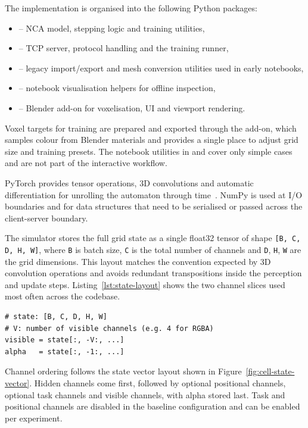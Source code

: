 The implementation is organised into the following Python packages:

\begin{itemize}
        \item {} -- NCA model, stepping logic and training
          utilities,
        \item {} -- TCP server, protocol handling and the
          training runner,
    \item {} -- legacy import/export and mesh conversion
          utilities used in early notebooks,
    \item {} -- notebook visualisation helpers for offline
          inspection,
    \item {} -- Blender add-on for voxelisation, UI and
          viewport rendering.
\end{itemize}

Voxel targets for training are prepared and exported through the add-on, which
samples colour from Blender materials and provides a single place to adjust
grid size and training presets. The notebook utilities in  and
 cover only simple cases and are not part of the interactive
workflow.

PyTorch provides tensor operations, 3D convolutions and automatic
differentiation for unrolling the automaton through
time~\cite{PaszkePyTorch, PyTorchDocs}. NumPy is used at I/O boundaries and
for data structures that need to be serialised or passed across the
client-server boundary.

The simulator stores the full grid state as a single float32 tensor of shape
\texttt{[B, C, D, H, W]}, where \texttt{B} is batch size, \texttt{C} is the
total number of channels and \texttt{D}, \texttt{H}, \texttt{W} are the grid
dimensions. This layout matches the convention expected by 3D convolution
operations and avoids redundant transpositions inside the perception and update
steps. Listing~\ref{lst:state-layout} shows the two channel slices used most
often across the codebase.

\begin{lstlisting}[style=py, caption={Common channel slices into the state
tensor.}, label={lst:state-layout}]
# state: [B, C, D, H, W]
# V: number of visible channels (e.g. 4 for RGBA)
visible = state[:, -V:, ...]
alpha   = state[:, -1:, ...]
\end{lstlisting}

Channel ordering follows the state vector layout shown in
Figure~\ref{fig:cell-state-vector}. Hidden channels come first, followed by
optional positional channels, optional task channels and visible channels,
with alpha stored last. Task and positional channels are disabled in the
baseline configuration and can be enabled per experiment.

